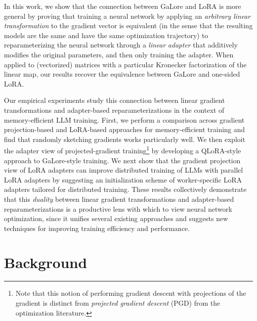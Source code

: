 In this work, we show that the  connection between GaLore and  LoRA is more general by proving that training a neural network by applying an \emph{arbitrary linear transformation} to the gradient vector is equivalent (in the sense that the resulting models are the same and have the same optimization trajectory) to reparameterizing the neural network through a \emph{linear adapter} that additively modifies the original parameters, and then only training the adapter. 
When applied to (vectorized) matrices with a particular Kronecker factorization of the linear map, our results recover the equivalence between GaLore and one-sided LoRA.  

Our empirical experiments study this  connection between linear gradient transformations and adapter-based reparameterizations  in the context of memory-efficient LLM training.
First, we perform a comparison across gradient projection-based and LoRA-based approaches for memory-efficient training and find that randomly sketching gradients works particularly well. 
We  then exploit the adapter view of  projected-gradient training\footnote{Note that this notion of performing gradient descent with projections of the gradient is distinct from \emph{projected gradient descent} (PGD) from the optimization literature.} by developing a QLoRA-style \citep{qlora} approach to GaLore-style training. We next  show that the gradient projection view of LoRA adapters can improve  distributed training of LLMs with parallel LoRA adapters \citep{lte} by suggesting an initialization scheme of worker-specific LoRA adapters  tailored for distributed training. These results collectively demonstrate that this \textit{duality} between linear gradient transformations and 
adapter-based reparameterizations is a productive lens with which to view neural network
optimization, since it unifies several existing approaches and suggests new techniques for improving training efficiency and performance.






















\vcram{-2mm}
\section{Background}
\vcram{-1mm}

